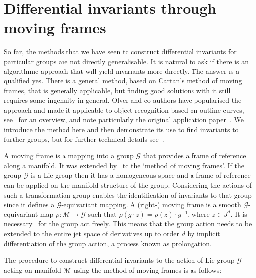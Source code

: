 \documentclass[review,onefignum,onetabnum]{siamonline190516}
\begin{document}
\section{Differential invariants through moving frames}\label{sec:movingframes}

So far, the methods that we have seen to construct differential invariants for particular groups are not directly generalisable. It is natural to ask if there is an algorithmic approach that will yield invariants more directly. The answer is a qualified yes. There is a general method, based on Cartan's method of moving frames, that is generally applicable, but finding good solutions with it still requires some ingenuity in general. Olver and co-authors have popularised the approach and made it applicable to object recognition based on outline curves, see~\citet{Olver2005} for an overview, and note particularly the original application paper~\citep{Calabi1998}.  We introduce the method here and then demonstrate its use to find invariants to further groups, but for further technical details see~\citet{OlverCIT}. 

A moving frame is a mapping into a group $\mathcal{G}$ that provides a frame of reference along a manifold.  It was extended by~\citet{Cartan35} to the `method of moving frames'. If the group $\mathcal{G}$ is a Lie group then it has a homogeneous space and a frame of reference can be applied on the manifold structure of the group. Considering the actions of such a transformation group enables the identification of invariants to that group since it defines a $\mathcal{G}$-equivariant mapping. A (right-) moving frame is a smooth $\mathcal{G}$-equivariant map $\rho : \mathcal{M} \to \mathcal{G}$ such that $\rho (g \cdot z) = \rho(z) \cdot g^{-1}$, where $z \in J^d$. It is necessary~\citep{Olver2013} for the group act freely. This means that the group action needs to be extended to the entire jet space of derivatives up to order $d$ by implicit differentiation of the group action, a process known as prolongation.


The procedure to construct differential invariants to the action of Lie group $\mathcal{G}$ acting on manifold $\mathcal{M}$ using the method of moving frames is as follows:
\end{document}
